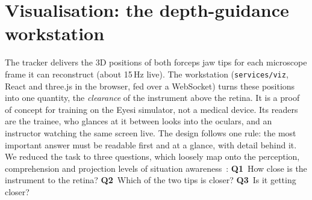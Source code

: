 
\newcommand{\vizbadge}[3]{%
  \draw[vizlead] (#2) -- (#3);
  \node[vizbadge] at (#2) {#1};}

\section{Visualisation: the depth-guidance workstation}\label{sec:viz}

The tracker delivers the 3D positions of both forceps jaw tips for each
microscope frame it can reconstruct (about 15\,Hz live). The workstation
(\texttt{services/viz}, React and three.js in the browser, fed over a WebSocket)
turns these positions into one quantity, the \emph{clearance} of the instrument
above the retina. It is a proof of concept for training on the Eyesi simulator,
not a medical device. Its readers are the trainee, who glances at it between
looks into the oculars, and an instructor watching the same screen live. The design follows one rule: the most important answer must be readable first and at a glance, with
detail behind it. We reduced the task to three questions, which loosely map onto
the perception, comprehension and projection levels of situation
awareness~\cite{endsley1995}:
\textbf{Q1}~How close is the instrument to the retina?
\textbf{Q2}~Which of the two tips is closer?
\textbf{Q3}~Is it getting closer?

